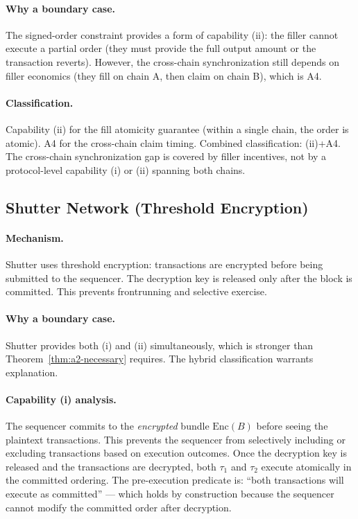 \paragraph{Why a boundary case.}
The signed-order constraint provides a form of capability (ii): the filler
cannot execute a partial order (they must provide the full output amount or
the transaction reverts). However, the cross-chain synchronization still
depends on filler economics (they fill on chain A, then claim on chain B),
which is A4.

\paragraph{Classification.}
Capability (ii) for the fill atomicity guarantee (within a single chain, the
order is atomic). A4 for the cross-chain claim timing. Combined classification:
(ii)+A4. The cross-chain synchronization gap is covered by filler incentives,
not by a protocol-level capability (i) or (ii) spanning both chains.

\subsection{Shutter Network (Threshold Encryption)}
\label{app:shutter}

\paragraph{Mechanism.}
Shutter uses threshold encryption: transactions are encrypted before being
submitted to the sequencer. The decryption key is released only after the
block is committed. This prevents frontrunning and selective exercise.

\paragraph{Why a boundary case.}
Shutter provides both (i) and (ii) simultaneously, which is stronger than
Theorem~\ref{thm:a2-necessary} requires. The hybrid classification warrants
explanation.

\paragraph{Capability (i) analysis.}
The sequencer commits to the \emph{encrypted} bundle $\text{Enc}(B)$ before
seeing the plaintext transactions. This prevents the sequencer from selectively
including or excluding transactions based on execution outcomes. Once the
decryption key is released and the transactions are decrypted, both $\tau_1$
and $\tau_2$ execute atomically in the committed ordering. The pre-execution
predicate is: ``both transactions will execute as committed'' --- which holds by
construction because the sequencer cannot modify the committed order after
decryption.

